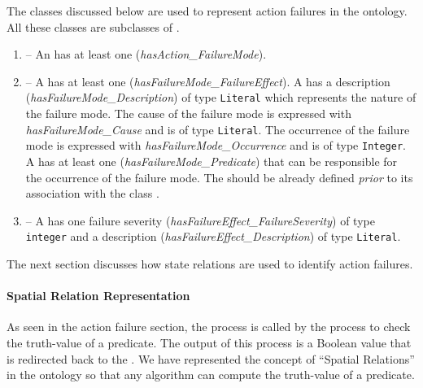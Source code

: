 The classes discussed below are used to represent action failures in the  ontology. All these classes are subclasses of .
\begin{enumerate}
\item {} -- An  has at least one  (\emph{hasAction\_FailureMode}).
\item {} -- A  has at least one  (\emph{hasFailureMode\_FailureEffect}). A  has a description (\emph{hasFailureMode\_Description}) of type \texttt{Literal} which represents the nature of the failure mode. The cause of the failure mode is expressed with \emph{hasFailureMode\_Cause} and is of type \texttt{Literal}. The occurrence of the failure mode is expressed with \emph{hasFailureMode\_Occurrence} and is of type \texttt{Integer}. A  has at least one  (\emph{hasFailureMode\_Predicate}) that can be responsible for the occurrence of the failure mode. The  should be already defined \textit{prior} to its association with the class .
\item {} -- A  has one failure severity (\emph{hasFailureEffect\_FailureSeverity}) of type \texttt{integer} and a description (\emph{hasFailureEffect\_Description}) of type \texttt{Literal}.
\end{enumerate}

The next section discusses how state relations are used to identify action failures.
\paragraph{Spatial Relation Representation}
As seen in the action failure section, the  process is called by the  process to check the truth-value of a predicate. The output of this process is a Boolean value that is redirected back to the . We have represented the concept of ``Spatial Relations'' in the  ontology so that any algorithm can compute the truth-value of a predicate.

